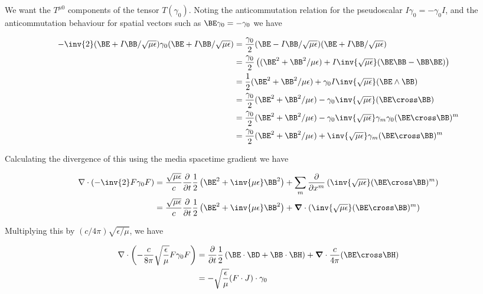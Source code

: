 We want the $T^{\mu 0}$ components of the tensor $T(\gamma_0)$.  Noting the anticommutation relation for the pseudoscalar $I \gamma_0 = -\gamma_0 I$, and the anticommutation behaviour for spatial vectors such as $\BE \gamma_0 = -\gamma_0$ we have

\begin{align*}
-\inv{2} (\BE + I\BB/\sqrt{\mu\epsilon}) \gamma_0 (\BE + I\BB/\sqrt{\mu\epsilon})
&=
\frac{\gamma_0}{2} (\BE - I\BB/\sqrt{\mu\epsilon}) (\BE + I\BB/\sqrt{\mu\epsilon}) \\
&=
\frac{\gamma_0}{2} \left( (\BE^2 + \BB^2/{\mu\epsilon}) + I \inv{\sqrt{\mu\epsilon}} (\BE\BB - \BB\BE) \right) \\
&=
\frac{1}{2} (\BE^2 + \BB^2/{\mu\epsilon}) + \gamma_0 I \inv{\sqrt{\mu\epsilon}} (\BE \wedge \BB) \\
&=
\frac{\gamma_0}{2} (\BE^2 + \BB^2/{\mu\epsilon}) - \gamma_0 \inv{\sqrt{\mu\epsilon}} (\BE \cross \BB) \\
&=
\frac{\gamma_0}{2} (\BE^2 + \BB^2/{\mu\epsilon}) - \gamma_0 \inv{\sqrt{\mu\epsilon}} \gamma_m \gamma_0 (\BE \cross \BB)^m \\
&=
\frac{\gamma_0}{2} (\BE^2 + \BB^2/{\mu\epsilon}) + \inv{\sqrt{\mu\epsilon}} \gamma_m (\BE \cross \BB)^m \\
\end{align*}

Calculating the divergence of this using the media spacetime gradient we have

\begin{align*}
\grad \cdot \left( -\inv{2} F \gamma_0 F \right)
&=
\frac{\sqrt{\mu\epsilon}}{c} \frac{\partial}{\partial t} \frac{1}{2} \left(\BE^2 + \inv{\mu\epsilon}\BB^2\right)
+ \sum_m
\frac{\partial}{\partial x^m} \left( \inv{\sqrt{\mu\epsilon}} (\BE \cross \BB)^m \right) \\
&=
\frac{\sqrt{\mu\epsilon}}{c} \frac{\partial}{\partial t} \frac{1}{2} \left(\BE^2 + \inv{\mu\epsilon}\BB^2 \right)
+ \spacegrad \cdot \left( \inv{\sqrt{\mu\epsilon}} (\BE \cross \BB)^m \right)
\end{align*}

Multiplying this by $(c/4\pi) \sqrt{\epsilon/\mu}$, we have

\begin{align*}
\grad \cdot \left( -\frac{c}{8 \pi} \sqrt{\frac{\epsilon}{\mu}} F \gamma_0 F \right)
&=
\frac{\partial}{\partial t} \frac{1}{2} \left(\BE \cdot \BD + \BB \cdot \BH \right) + \spacegrad \cdot \frac{c}{4\pi}(\BE \cross \BH) \\
&=
- \sqrt{\frac{\epsilon}{\mu}}(F \cdot J) \cdot \gamma_0 \\
\end{align*}

